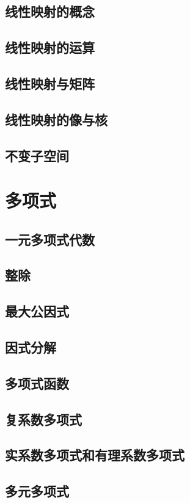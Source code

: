 \documentclass[a4paper, 11pt]{ctexbook}
\begin{document}
        \section{线性映射的概念}
        \section{线性映射的运算}
        \section{线性映射与矩阵}
        \section{线性映射的像与核}
        \section{不变子空间}
    \chapter{多项式}
        \section{一元多项式代数}
        \section{整除}
        \section{最大公因式}
        \section{因式分解}
        \section{多项式函数}
        \section{复系数多项式}
        \section{实系数多项式和有理系数多项式}
        \section{多元多项式}
\end{document}
